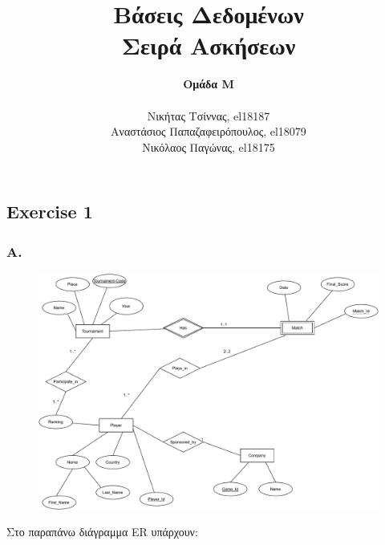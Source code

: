 \documentclass[a4paper]{article}
\title{Βάσεις Δεδομένων \\ Σειρά Ασκήσεων}
\author{\textbf{Ομάδα Μ} \\~\\ Νικήτας Τσίννας, el18187 \\ Αναστάσιος Παπαζαφειρόπουλος, el18079 \\ Νικόλαος Παγώνας, el18175}
\date{}
\begin{document}
\maketitle

\subsection*{Exercise 1}

\subsubsection*{A.}

\begin{figure}[H]
	\includegraphics[width=\textwidth]{ex1_ER_final.pdf}
\end{figure}

Στο παραπάνω διάγραμμα ER υπάρχουν:
\end{document}
